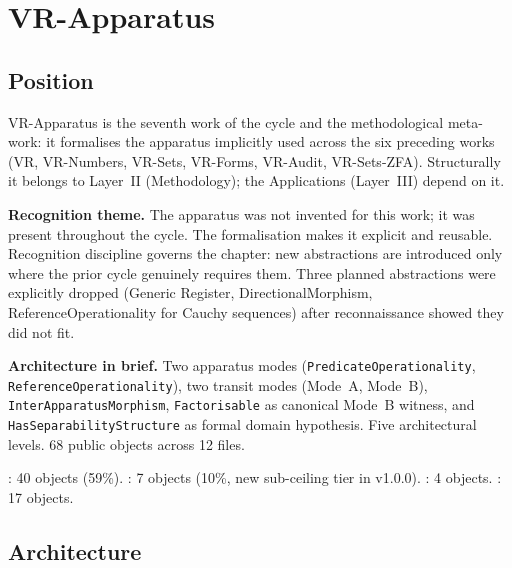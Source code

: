 \chapter{VR-Apparatus}
\label{chap:apparatus}

\section{Position}
\label{sec:apparatus_position}

VR-Apparatus is the seventh work of the cycle and the methodological
meta-work: it formalises the apparatus implicitly used across the six
preceding works (VR, VR-Numbers, VR-Sets, VR-Forms, VR-Audit, VR-Sets-ZFA).
Structurally it belongs to Layer~II (Methodology); the Applications
(Layer~III) depend on it.

\textbf{Recognition theme.} The apparatus was not invented for this work;
it was present throughout the cycle.  The formalisation makes it explicit
and reusable.  Recognition discipline governs the chapter: new abstractions
are introduced only where the prior cycle genuinely requires them.  Three
planned abstractions were explicitly dropped (Generic Register, DirectionalMorphism,
ReferenceOperationality for Cauchy sequences) after reconnaissance showed
they did not fit.

\textbf{Architecture in brief.} Two apparatus modes
(\texttt{PredicateOperationality}, \texttt{ReferenceOperationality}),
two transit modes (Mode~A, Mode~B), \texttt{InterApparatusMorphism},
\texttt{Factorisable} as canonical Mode~B witness, and
\texttt{HasSeparabilityStructure} as formal domain hypothesis.  Five
architectural levels.  68 public objects across 12 files.

\noindent\axiomprofile{[]}: 40 objects (59\%).
: 7 objects (10\%, new sub-ceiling tier in v1.0.0).
: 4 objects.
: 17 objects.

\section{Architecture}
\label{sec:apparatus_arch}

